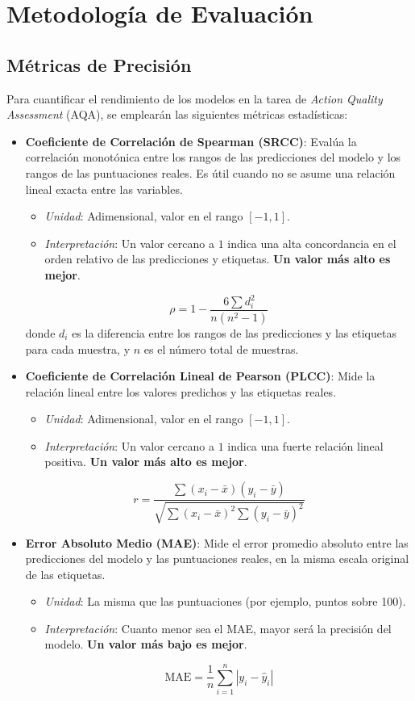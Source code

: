 \section{Metodología de Evaluación}
\label{sec:evaluacion}

\subsection{Métricas de Precisión}

Para cuantificar el rendimiento de los modelos en la tarea de \textit{Action Quality Assessment} (AQA), se emplearán las siguientes métricas estadísticas:

\begin{itemize}
    \item \textbf{Coeficiente de Correlación de Spearman (SRCC)}: Evalúa la correlación monotónica entre los rangos de las predicciones del modelo y los rangos de las puntuaciones reales. Es útil cuando no se asume una relación lineal exacta entre las variables.
    \begin{itemize}
        \item \textit{Unidad}: Adimensional, valor en el rango \([-1, 1]\).
        \item \textit{Interpretación}: Un valor cercano a \(1\) indica una alta concordancia en el orden relativo de las predicciones y etiquetas. \textbf{Un valor más alto es mejor}.
    \end{itemize}
    \[
    \rho = 1 - \frac{6 \sum d_i^2}{n(n^2 - 1)}
    \]
    donde \(d_i\) es la diferencia entre los rangos de las predicciones y las etiquetas para cada muestra, y \(n\) es el número total de muestras.

    \item \textbf{Coeficiente de Correlación Lineal de Pearson (PLCC)}: Mide la relación lineal entre los valores predichos y las etiquetas reales.
    \begin{itemize}
        \item \textit{Unidad}: Adimensional, valor en el rango \([-1, 1]\).
        \item \textit{Interpretación}: Un valor cercano a \(1\) indica una fuerte relación lineal positiva. \textbf{Un valor más alto es mejor}.
    \end{itemize}
    \[
    r = \frac{\sum (x_i - \bar{x})(y_i - \bar{y})}{\sqrt{\sum (x_i - \bar{x})^2 \sum (y_i - \bar{y})^2}}
    \]

    \item \textbf{Error Absoluto Medio (MAE)}: Mide el error promedio absoluto entre las predicciones del modelo y las puntuaciones reales, en la misma escala original de las etiquetas.
    \begin{itemize}
        \item \textit{Unidad}: La misma que las puntuaciones (por ejemplo, puntos sobre 100).
        \item \textit{Interpretación}: Cuanto menor sea el MAE, mayor será la precisión del modelo. \textbf{Un valor más bajo es mejor}.
    \end{itemize}
    \[
    \text{MAE} = \frac{1}{n} \sum_{i=1}^n |y_i - \hat{y}_i|
    \]
\end{itemize}


